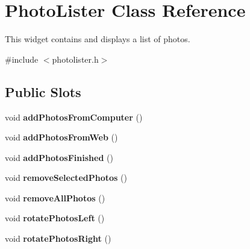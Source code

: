 \hypertarget{class_photo_lister}{
\section{PhotoLister Class Reference}
\label{class_photo_lister}
}


This widget contains and displays a list of photos.  




{\ttfamily \#include $<$photolister.h$>$}

\subsection*{Public Slots}
\begin{DoxyCompactItemize}
\item 
\hypertarget{class_photo_lister_a9f92af173ae38a2f1343a393cc6b9ce1}{
void {\bfseries addPhotosFromComputer} ()}
\label{class_photo_lister_a9f92af173ae38a2f1343a393cc6b9ce1}

\item 
\hypertarget{class_photo_lister_a9083124814ee6ce505f257657dcfd6eb}{
void {\bfseries addPhotosFromWeb} ()}
\label{class_photo_lister_a9083124814ee6ce505f257657dcfd6eb}

\item 
\hypertarget{class_photo_lister_a5f579d9ef5dc76692d64e14cd319abc3}{
void {\bfseries addPhotosFinished} ()}
\label{class_photo_lister_a5f579d9ef5dc76692d64e14cd319abc3}

\item 
\hypertarget{class_photo_lister_aa66b5ba82d2601effd77bd3fc078d3e0}{
void {\bfseries removeSelectedPhotos} ()}
\label{class_photo_lister_aa66b5ba82d2601effd77bd3fc078d3e0}

\item 
\hypertarget{class_photo_lister_a1d28f68db398db99bca6d379ffc3e28d}{
void {\bfseries removeAllPhotos} ()}
\label{class_photo_lister_a1d28f68db398db99bca6d379ffc3e28d}

\item 
\hypertarget{class_photo_lister_abb59b06e5ffd3292d598a5386f788dba}{
void {\bfseries rotatePhotosLeft} ()}
\label{class_photo_lister_abb59b06e5ffd3292d598a5386f788dba}

\item 
\hypertarget{class_photo_lister_a860bddcce4c50200d1fa53f2e572142b}{
void {\bfseries rotatePhotosRight} ()}
\label{class_photo_lister_a860bddcce4c50200d1fa53f2e572142b}


\end{DoxyCompactItemize}
